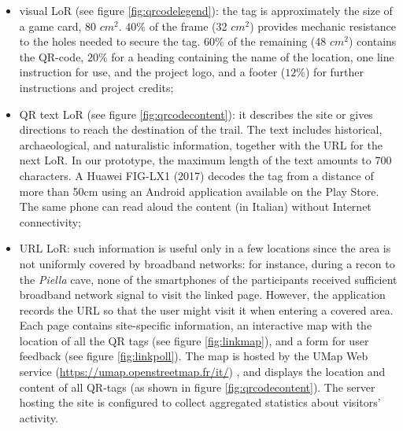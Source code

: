 \documentclass[sustainability,article,submit,pdftex,moreauthors]{Definitions/mdpi}
\begin{document}
\begin{itemize}
    \item visual LoR (see figure \ref{fig:qrcodelegend}): the tag is approximately the size of a game card, 80 $cm^2$. $40\%$ of the frame (32 $cm^2$) provides mechanic resistance to the holes needed to secure the tag. $60\%$ of the remaining (48 $cm^2$) contains the QR-code, $20\%$ for a heading containing the name of the location, one line instruction for use, and the project logo, and a footer ($12\%$) for further instructions and project credits;
    
    \item QR text LoR (see figure \ref{fig:qrcodecontent}): it describes the site or gives directions to reach the destination of the trail. The text includes historical, archaeological, and naturalistic information, together with the URL for the next LoR. In our prototype, the maximum length of the text amounts to 700 characters. A Huawei FIG-LX1 (2017) decodes the tag from a distance of more than 50cm using an Android application available on the Play Store. The same phone can read aloud the content (in Italian) without Internet connectivity;

    \item URL LoR: such information is useful only in a few locations since the area is not uniformly covered by broadband networks: for instance, during a recon to the {\em Piella} cave, none of the smartphones of the participants received sufficient broadband network signal to visit the linked page. However, the application records the URL so that the user might visit it when entering a covered area. Each page contains site-specific information, an interactive map with the location of all the QR tags (see figure \ref{fig:linkmap}), and a form for user feedback (see figure \ref{fig:linkpoll}). The map is hosted by the UMap Web service (\url{https://umap.openstreetmap.fr/it/}) , and displays the location and content of all QR-tags (as shown in figure \ref{fig:qrcodecontent}). The server hosting the site is configured to collect aggregated statistics about visitors' activity.
\end{itemize}
\end{document}

